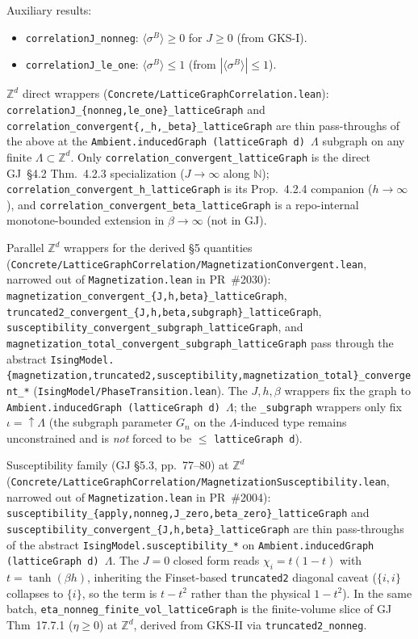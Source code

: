 \documentclass[a4paper,11pt]{article}
\begin{document}
Auxiliary results:
\begin{itemize}
  \item \texttt{correlationJ\_nonneg}: $\langle\sigma^B\rangle \ge 0$
    for $J \ge 0$ (from GKS-I).
  \item \texttt{correlationJ\_le\_one}: $\langle\sigma^B\rangle \le 1$
    (from $|\langle\sigma^B\rangle| \le 1$).
\end{itemize}

$\mathbb{Z}^d$ direct wrappers
(\texttt{Concrete/LatticeGraphCorrelation.lean}):
\texttt{correlationJ\_\{nonneg,le\_one\}\_latticeGraph} and
\texttt{correlation\_convergent\{,\_h,\_beta\}\_latticeGraph}
are thin pass-throughs of the above at the
\texttt{Ambient.inducedGraph (latticeGraph d)\,$\Lambda$}
subgraph on any finite $\Lambda \subset \mathbb{Z}^d$.
Only \texttt{correlation\_convergent\_latticeGraph} is the direct
GJ~\S4.2 Thm.~4.2.3 specialization ($J \to \infty$ along $\mathbb{N}$);
\texttt{correlation\_convergent\_h\_latticeGraph} is its
Prop.~4.2.4 companion ($h \to \infty$), and
\texttt{correlation\_convergent\_beta\_latticeGraph} is a repo-internal
monotone-bounded extension in $\beta \to \infty$ (not in GJ).

Parallel $\mathbb{Z}^d$ wrappers for the derived \S5 quantities
(\texttt{Concrete/LatticeGraphCorrelation/MagnetizationConvergent.lean},
narrowed out of \texttt{Magnetization.lean} in PR~\#2030):
\texttt{magnetization\_convergent\_\{J,h,beta\}\_latticeGraph},
\texttt{truncated2\_convergent\_\{J,h,beta,subgraph\}\_latticeGraph},
\texttt{susceptibility\_convergent\_subgraph\_latticeGraph}, and
\texttt{magnetization\_total\_convergent\_subgraph\_latticeGraph}
pass through the abstract
\texttt{IsingModel.\{magnetization,truncated2,susceptibility,magnetization\_total\}\_convergent\_*}
(\texttt{IsingModel/PhaseTransition.lean}). The $J,h,\beta$ wrappers
fix the graph to \texttt{Ambient.inducedGraph (latticeGraph d)\,$\Lambda$};
the \texttt{\_subgraph} wrappers only fix $\iota = \operatorname{\uparrow}\Lambda$
(the subgraph parameter $G_n$ on the $\Lambda$-induced type remains
unconstrained and is \emph{not} forced to be $\le$ \texttt{latticeGraph d}).

Susceptibility family (GJ \S5.3, pp.~77–80) at $\mathbb{Z}^d$
(\texttt{Concrete/LatticeGraphCorrelation/MagnetizationSusceptibility.lean},
narrowed out of \texttt{Magnetization.lean} in PR~\#2004):
\texttt{susceptibility\_\{apply,nonneg,J\_zero,beta\_zero\}\_latticeGraph}
and \texttt{susceptibility\_convergent\_\{J,h,beta\}\_latticeGraph}
are thin pass-throughs of the abstract
\texttt{IsingModel.susceptibility\_*} on
\texttt{Ambient.inducedGraph (latticeGraph d)\,$\Lambda$}. The
$J=0$ closed form reads $\chi_i = t(1-t)$ with $t = \tanh(\beta h)$,
inheriting the Finset-based \texttt{truncated2} diagonal caveat
($\{i,i\}$ collapses to $\{i\}$, so the term is $t - t^2$ rather
than the physical $1 - t^2$). In the same batch,
\texttt{eta\_nonneg\_finite\_vol\_latticeGraph} is the
finite-volume slice of GJ Thm~17.7.1 ($\eta \ge 0$) at
$\mathbb{Z}^d$, derived from GKS-II via
\texttt{truncated2\_nonneg}.
\end{document}
